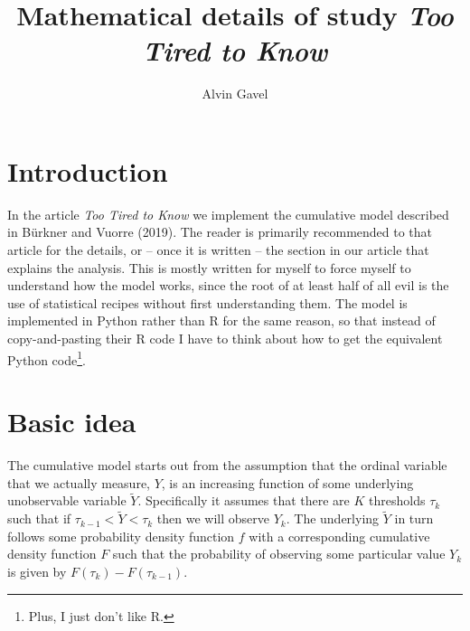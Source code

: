 \documentclass[10pt, twoside,a4paper]{article}
\title{Mathematical details of study \emph{Too Tired to Know}}
\author{Alvin Gavel}
\date{}
\begin{document}
\maketitle

\section{Introduction}
In the article \emph{Too Tired to Know} we implement the cumulative model described in Bürkner and Vuorre (2019). The reader is primarily recommended to that article for the details, or -- once it is written -- the section in our article that explains the analysis. This is mostly written for myself to force myself to understand how the model works, since the root of at least half of all evil is the use of statistical recipes without first understanding them. The model is implemented in Python rather than R for the same reason, so that instead of copy-and-pasting their R code I have to think about how to get the equivalent Python code\footnote{Plus, I just don't like R.}.

\section{Basic idea}
The cumulative model starts out from the assumption that the ordinal variable that we actually measure, $Y$, is an increasing function of some underlying unobservable variable $\tilde{Y}$. Specifically it assumes that there are $K$ thresholds $\tau_k$ such that if $\tau_{k-1} < \tilde{Y} < \tau_{k}$ then we will observe $Y_k$. The underlying $\tilde{Y}$ in turn follows some probability density function $f$ with a corresponding cumulative density function $F$ such that the probability of observing some particular value $Y_k$ is given by $F\left( \tau_k \right) - F\left( \tau_{k-1} \right)$.
\end{document}
